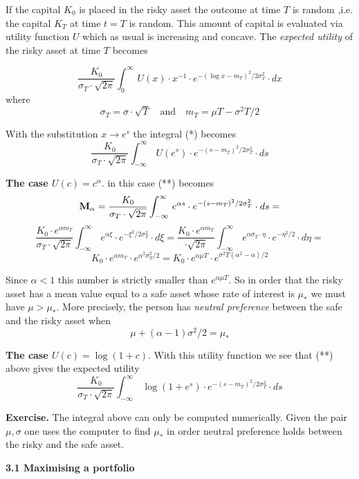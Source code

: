 \documentclass[12pt]{amsart}
\begin{document}
\noindent
If the capital $K_0$ is placed in the risky asset
the outcome at time $T$ is random ,i.e. the capital $K_T$ at time
$t=T$ is random.
This amount of capital is evaluated via utility function
$U$ which as usual is increasing and concave.
The \emph{expected utility}
of the risky asset at time $T$ becomes

\[
\frac{K_0}{\sigma_T\cdot \sqrt{2\pi}}\int_0^\infty\, U(x)\cdot x^{-1}\cdot e^{-(\log x-m_T)^2/2\sigma_T^2}\cdot dx\tag{*}
\]
where
\[ 
\sigma_T=\sigma\cdot\sqrt{T}\quad\text{and} \quad m_T= \mu T-\sigma^2T/2
\]

\noindent
With the substitution $x\to e^s$
the integral (*) becomes
\[
\frac{K_0}{\sigma_T\cdot \sqrt{2\pi}}\int_{-\infty}^\infty\, 
U(e^s)\cdot e^{-(s-m_T)^2/2\sigma_T^2}\cdot ds\tag{**}
\]

\noindent
{\bf{The case $U(c)= c^\alpha$}}.
in this case (**) becomes
\[
\bold M_\alpha= 
\frac{K_0}{\sigma_T\cdot \sqrt{2\pi}}\int_{-\infty}^\infty\, 
e^{\alpha s}\cdot e^{-(s-m_T)^2/2\sigma_T^2}\cdot ds=
\]
\[
\frac{K_0\cdot e^{\alpha m_T}}{\sigma_T\cdot \sqrt{2\pi}}\int_{-\infty}^\infty\, 
e^{\alpha \xi}\cdot e^{-\xi^2/2\sigma_T^2}\cdot d\xi=
\frac{K_0\cdot e^{\alpha m_T}}{\cdot \sqrt{2\pi}}\int_{-\infty}^\infty\, 
e^{\alpha \sigma_T\cdot \eta}\cdot e^{-\eta^2/2}\cdot d\eta=
\]
\[
K_0\cdot e^{\alpha m_T}\cdot e^{\alpha^2\sigma_T^2/2}=
K_0\cdot e^{\alpha\mu T}\cdot e^{\sigma^2T(\alpha^2-\alpha)/2}
\]




\medskip

\noindent
Since $\alpha<1$ this number is strictly smaller than
$e^{\alpha\mu T}$.
So in order that the risky asset
has a mean value equal to a safe asset whose rate of interest is $\mu_*$
we must have 
$\mu>\mu_*$. More precisely,
the person has  \emph{neutral preference} between the safe and the risky asset
when 
\[
\mu+(\alpha-1)\sigma^2/2=\mu_*\tag{***}
\]

\bigskip
\noindent
{\bf{The case $U(c)= \log(1+c)$}}.
With this utility function  we see that (**) above gives
the expected
utility
\[
\frac{K_0}{\sigma_T\cdot \sqrt{2\pi}}\int_{-\infty}^\infty\, 
\log
(1+e^s)\cdot e^{-(s-m_T)^2/2\sigma_T^2}\cdot ds
\]

\noindent
{\bf{Exercise.}}
The integral above can only be computed numerically.
Given the pair $\mu,\sigma$
one uses the computer  to find $\mu_*$ in order
neutral preference holds between the risky and the safe asset.

\bigskip


\centerline{\bf 3.1 Maximising a portfolio}
\end{document}
